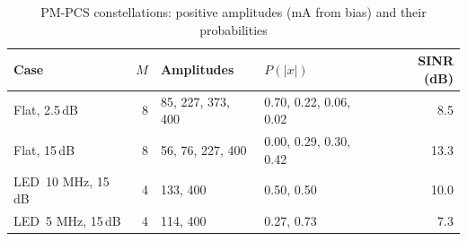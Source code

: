 \begin{table}[t]\centering\footnotesize\setlength{\tabcolsep}{3pt}
\caption{PM-PCS constellations: positive amplitudes (mA from bias) and their probabilities}\label{tab:pmshapes}
\begin{tabular}{@{}p{1.75cm}rp{1.95cm}p{1.95cm}r@{}}\toprule
Case & $M$ & Amplitudes & $P(|x|)$ & SINR (dB) \\\midrule
Flat, 2.5\,dB & 8 & 85, 227, 373, 400 & 0.70, 0.22, 0.06, 0.02 & 8.5 \\
Flat, 15\,dB & 8 & 56, 76, 227, 400 & 0.00, 0.29, 0.30, 0.42 & 13.3 \\
LED~10 MHz, 15\,dB & 4 & 133, 400 & 0.50, 0.50 & 10.0 \\
LED~5 MHz, 15\,dB & 4 & 114, 400 & 0.27, 0.73 & 7.3 \\
\bottomrule\end{tabular}\end{table}
